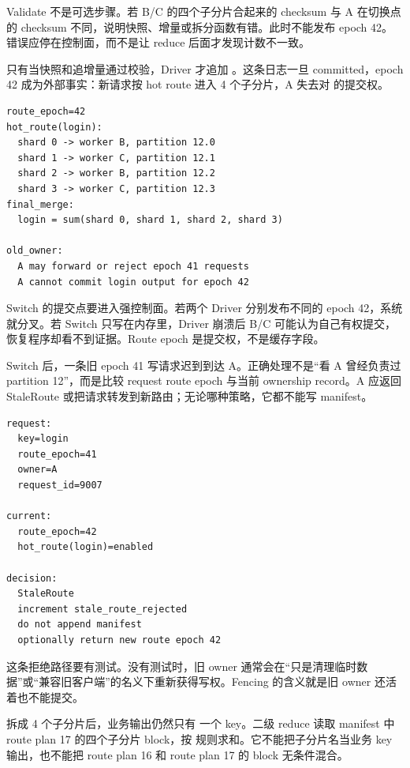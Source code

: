 Validate 不是可选步骤。若 B/C 的四个子分片合起来的 checksum 与 A 在切换点的 checksum 不同，说明快照、增量或拆分函数有错。此时不能发布 epoch 42。错误应停在控制面，而不是让 reduce 后面才发现计数不一致。

只有当快照和追增量通过校验，Driver 才追加 。这条日志一旦 committed，epoch 42 成为外部事实：新请求按 hot route 进入 4 个子分片，A 失去对  的提交权。

\begin{lstlisting}[numbers=none,caption={Switch 后的路由表}]
route_epoch=42
hot_route(login):
  shard 0 -> worker B, partition 12.0
  shard 1 -> worker C, partition 12.1
  shard 2 -> worker B, partition 12.2
  shard 3 -> worker C, partition 12.3
final_merge:
  login = sum(shard 0, shard 1, shard 2, shard 3)

old_owner:
  A may forward or reject epoch 41 requests
  A cannot commit login output for epoch 42
\end{lstlisting}

Switch 的提交点要进入强控制面。若两个 Driver 分别发布不同的 epoch 42，系统就分叉。若 Switch 只写在内存里，Driver 崩溃后 B/C 可能认为自己有权提交，恢复程序却看不到证据。Route epoch 是提交权，不是缓存字段。

Switch 后，一条旧 epoch 41 写请求迟到到达 A。正确处理不是“看 A 曾经负责过 partition 12”，而是比较 request route epoch 与当前 ownership record。A 应返回 StaleRoute 或把请求转发到新路由；无论哪种策略，它都不能写 manifest。

\begin{lstlisting}[numbers=none,caption={旧路由写的拒绝路径}]
request:
  key=login
  route_epoch=41
  owner=A
  request_id=9007

current:
  route_epoch=42
  hot_route(login)=enabled

decision:
  StaleRoute
  increment stale_route_rejected
  do not append manifest
  optionally return new route epoch 42
\end{lstlisting}

这条拒绝路径要有测试。没有测试时，旧 owner 通常会在“只是清理临时数据”或“兼容旧客户端”的名义下重新获得写权。Fencing 的含义就是旧 owner 还活着也不能提交。

拆成 4 个子分片后，业务输出仍然只有  一个 key。二级 reduce 读取 manifest 中 route plan 17 的四个子分片 block，按  规则求和。它不能把子分片名当业务 key 输出，也不能把 route plan 16 和 route plan 17 的 block 无条件混合。

